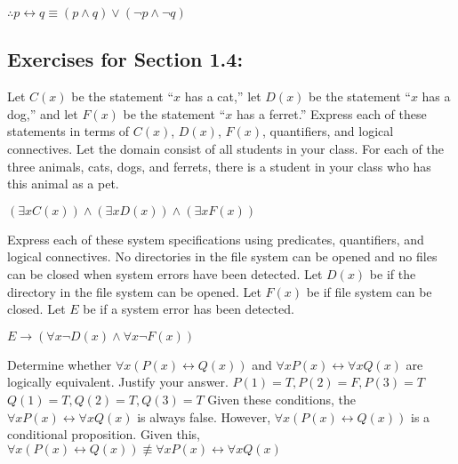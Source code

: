\documentclass[12pt]{article}  %
\newcommand{\NOT}{\neg}
\newcommand{\AND}{\wedge}
\newcommand{\OR}{\vee}
\newcommand{\IMPLIES}{\rightarrow}
\newcommand{\IFF}{\leftrightarrow}
\begin{document}
$\therefore p\IFF q\equiv(p\AND q)\OR(\NOT{p}\AND\NOT q)$
\clearpage


\subsection*{Exercises for Section 1.4:}     

\newline
Let $C(x)$ be the statement “$x$ has a cat,” let $D(x)$ be the
statement “$x$ has a dog,” and let $F(x)$ be the statement “$x$
has a ferret.” Express each of these statements in terms
of $C(x)$, $D(x)$, $F(x)$, quantifiers, and logical connectives.
Let the domain consist of all students in your class.
\newline
For each of the three animals, cats, dogs, and ferrets,
there is a student in your class who has this animal as
a pet.

$(\exists xC(x))\land(\exists xD(x))\land(\exists xF(x))$

\newline
Express each of these system specifications using predicates, quantifiers, and logical connectives.\newline
No directories in the file system can be opened and no files can be closed when system errors have been detected.\newline
Let $D(x)$ be if the directory in the file system can be opened.\newline
Let $F(x)$ be if file system can be closed.\newline
Let $E$ be if a system error has been detected.\newline

$E\IMPLIES(\forall x\neg{D(x)}\AND{\forall x \neg{F(x)}})$

\newline
Determine whether $\forall x (P(x)\IFF{Q(x)})$ and $\forall x P(x)\IFF{\forall xQ(x)}$ are logically equivalent. Justify your answer.\newline
\newline
$P(1)=T, P(2)=F, P(3)=T$\newline
$Q(1)=T, Q(2)=T, Q(3)=T$\newline
Given these conditions, the $\forall x P(x)\IFF{\forall xQ(x)}$ is always false.\newline
However, $\forall x (P(x)\IFF{Q(x)})$ is a conditional proposition.\newline
Given this, $\forall x (P(x)\IFF{Q(x)})\not\equiv\forall x P(x)\IFF{\forall xQ(x)}$

\clearpage

\end{document}
